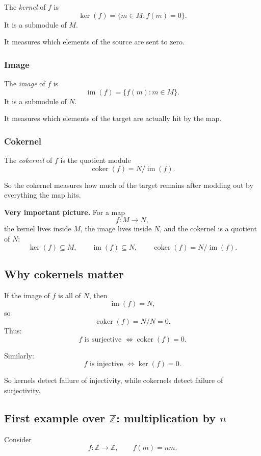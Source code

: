 \documentclass[12pt,a4paper]{article}
\theoremstyle{notespace}
\theoremstyle{definition}
\begin{document}
The \emph{kernel} of \(f\) is
\[
\ker(f)=\{m\in M:f(m)=0\}.
\]
It is a submodule of \(M\).

It measures which elements of the source are sent to zero.

\subsubsection*{Image}

The \emph{image} of \(f\) is
\[
\operatorname{im}(f)=\{f(m):m\in M\}.
\]
It is a submodule of \(N\).

It measures which elements of the target are actually hit by the map.

\subsubsection*{Cokernel}

The \emph{cokernel} of \(f\) is the quotient module
\[
\operatorname{coker}(f)=N/\operatorname{im}(f).
\]

So the cokernel measures how much of the target remains after modding out by everything the map hits.

\medskip

\textbf{Very important picture.}
For a map
\[
f:M\to N,
\]
the kernel lives inside \(M\), the image lives inside \(N\), and the cokernel is a quotient of \(N\):
\[
\ker(f)\subseteq M,
\qquad
\operatorname{im}(f)\subseteq N,
\qquad
\operatorname{coker}(f)=N/\operatorname{im}(f).
\]

\subsection{ Why cokernels matter}

If the image of \(f\) is all of \(N\), then
\[
\operatorname{im}(f)=N,
\]
so
\[
\operatorname{coker}(f)=N/N=0.
\]
Thus:
\[
f \text{ is surjective } \Longleftrightarrow \operatorname{coker}(f)=0.
\]

Similarly:
\[
f \text{ is injective } \Longleftrightarrow \ker(f)=0.
\]

So kernels detect failure of injectivity, while cokernels detect failure of surjectivity.

\subsection{ First example over \(\mathbb Z\): multiplication by \(n\)}

Consider
\[
f:\mathbb Z \longrightarrow \mathbb Z,
\qquad
f(m)=nm.
\]
\end{document}
